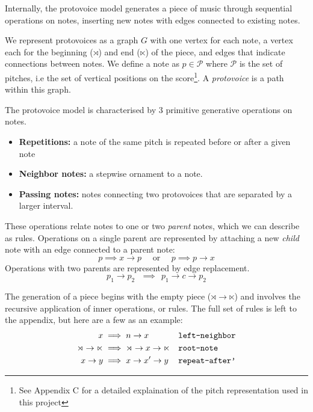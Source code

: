 \documentclass[12pt,a4paper,twoside,openright]{report}
\theoremstyle{definition}
\begin{document}
Internally, the protovoice model generates a piece of music through sequential operations on notes, inserting new notes with edges connected to existing notes.

We represent protovoices as a graph $G$ with one vertex for each note, a vertex each for the beginning ($\rtimes$) and end ($\ltimes$) of the piece, and edges that indicate connections between notes.
We define a note as $p \in \mathcal{P}$ where $\mathcal{P}$ is the set of pitches, i.e the set of vertical positions on the score\footnote{See Appendix C for a detailed explaination of the pitch representation used in this project}. 
A \textit{protovoice} is a path within this graph.

\par 
The protovoice model is characterised by 3 primitive generative operations on notes.

\begin{itemize}
  \item \textbf{Repetitions:} a note of the same pitch is repeated before or after a given note
  \item \textbf{Neighbor notes:} a stepwise ornament to a note. 
  \item \textbf{Passing notes:} notes connecting two protovoices that are separated by a larger interval.
\end{itemize}

These operations relate notes to one or two \textit{parent} notes, which we can describe as rules. Operations on a single parent are represented by attaching a new \textit{child} note with an edge connected to a parent note: 
\begin{equation}
  p \implies x \to p \text{~~~~or~~~~} p \implies p \to x 
  \label{eq:singlesidedinnerop}
\end{equation}
Operations with two parents are represented by edge replacement. 
\begin{equation}
  p_1 \to p_2 ~~~\implies~~ p_1 \to c \to p_2 \label{edge replacement}
  \label{eq:doublesidedinnerop}
\end{equation}

The generation of a piece begins with the empty piece ($\rtimes \to \ltimes$) and involves the recursive application of inner operations, or rules. The full set of rules is left to the appendix, but here are a few as an example:
\begin{equation}
  \begin{align}
    x &\implies n \to x && \text{\texttt{left-neighbor}}
  \label{eq:leftNeighbor} \\
    \rtimes \to \ltimes &\implies \rtimes \to x \to \ltimes && \text{\texttt{root-note}}
  \label{eq:rootNote} \\
    x \to y &\implies x \to x' \to y && \text{\texttt{repeat-after'}}
  \label{eq:repeatAfter}\\
  \end{align} 
\end{equation}
\end{document}

